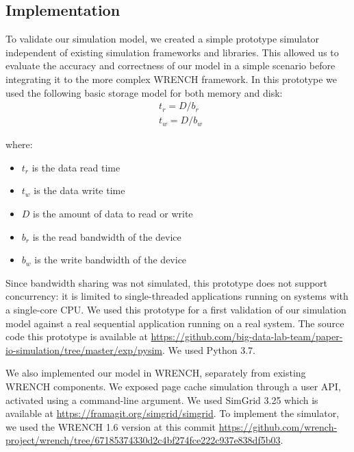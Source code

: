 \documentclass[conference]{IEEEtran}
\begin{document}
        \subsection{Implementation}

            To validate our simulation model, we created a simple prototype
            simulator independent of existing simulation frameworks and libraries. 
            This allowed us to evaluate the accuracy and correctness of our 
            model in a simple scenario before integrating it to the more complex 
            WRENCH framework. 
            In this prototype we used the following basic storage model for 
            both memory and disk: 
            \begin{align*}
                & t_{r} = D / b_r \\ 
                & t_{w} = D / b_w\
            \end{align*}        
            
            where:
            \begin{itemize}
                \item $t_{r}$ is the data read time
                \item $t_{w}$ is the data write time
                \item $D$ is the amount of data to read or write
                \item $b_r$ is the read bandwidth of the device
                \item $b_w$ is the write bandwidth of the device
            \end{itemize}

            Since bandwidth sharing was not simulated, this prototype does not support
            concurrency: it is limited to single-threaded applications running on systems
            with a single-core CPU. We used this prototype for a first validation of our simulation
            model against a real sequential application running on a real system.
            The source code this prototype is available at
            \url{https://github.com/big-data-lab-team/paper-io-simulation/tree/master/exp/pysim}. We used Python 3.7.

            We also implemented our model in WRENCH, separately from existing WRENCH components. 
            We exposed page cache simulation through a user API, activated using a command-line argument.
            We used SimGrid 3.25 which is available at \url{https://framagit.org/simgrid/simgrid}.
            To implement the simulator, we used the WRENCH 1.6 version at this commit \url{https://github.com/wrench-project/wrench/tree/67185374330d2c4bf274fce222c937e838df5b03}.
\end{document}

